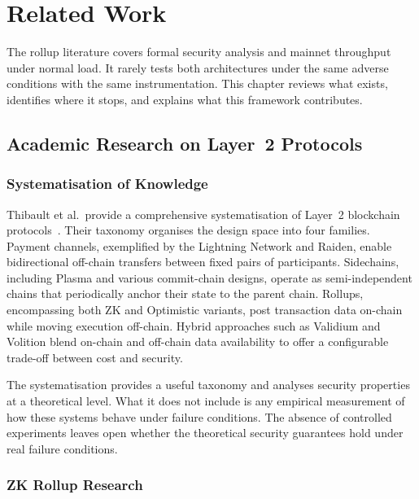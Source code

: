 \chapter{Related Work}
\label{ch:relatedwork}

The rollup literature covers formal security analysis and mainnet throughput under normal load. It rarely tests both architectures under the same adverse conditions with the same instrumentation. This chapter reviews what exists, identifies where it stops, and explains what this framework contributes.

\section{Academic Research on Layer~2 Protocols}

\subsection{Systematisation of Knowledge}

Thibault et al.\ provide a comprehensive systematisation of Layer~2 blockchain protocols~\cite{sok-layer2}. Their taxonomy organises the design space into four families. Payment channels, exemplified by the Lightning Network and Raiden, enable bidirectional off-chain transfers between fixed pairs of participants. Sidechains, including Plasma and various commit-chain designs, operate as semi-independent chains that periodically anchor their state to the parent chain. Rollups, encompassing both ZK and Optimistic variants, post transaction data on-chain while moving execution off-chain. Hybrid approaches such as Validium and Volition blend on-chain and off-chain data availability to offer a configurable trade-off between cost and security.

The systematisation provides a useful taxonomy and analyses security properties at a theoretical level. What it does not include is any empirical measurement of how these systems behave under failure conditions. The absence of controlled experiments leaves open whether the theoretical security guarantees hold under real failure conditions.

\subsection{ZK Rollup Research}

